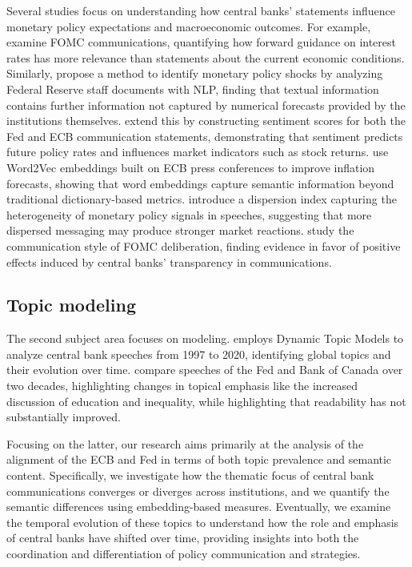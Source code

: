 Several studies focus on understanding how central banks' statements influence monetary policy expectations and macroeconomic outcomes. For example, \cite{hansen_shocking_2016} examine FOMC communications, quantifying how forward guidance on interest rates has more relevance than statements about the current economic conditions. Similarly,  \cite{aruoba_identifying_2024} propose a method to identify monetary policy shocks by analyzing Federal Reserve staff documents with NLP, finding that textual information contains further information not captured by numerical forecasts provided by the institutions themselves. \cite{hilscher_information_2024} extend this by constructing sentiment scores for both the Fed and ECB communication statements, demonstrating that sentiment predicts future policy rates and influences market indicators such as stock returns. \cite{ecb_word2prices_2025} use Word2Vec embeddings built on ECB press conferences to improve inflation forecasts, showing that word embeddings capture semantic information beyond traditional dictionary-based metrics. \cite{ahrens_extracting_2021} introduce a dispersion index capturing the heterogeneity of monetary policy signals in speeches, suggesting that more dispersed messaging may produce stronger market reactions. \cite{hansen_transparency_2018} study the communication style of FOMC deliberation, finding evidence in favor of positive effects induced by central banks' transparency in communications. 

\subsection{Topic modeling}

The second subject area focuses on modeling.  \cite{hansson_evolution_2021} employs Dynamic Topic Models to analyze central bank speeches from 1997 to 2020, identifying global topics and their evolution over time. \cite{ahrens_extracting_2021} compare speeches of the Fed and Bank of Canada over two decades, highlighting changes in topical emphasis like the increased discussion of education and inequality, while highlighting that readability has not substantially improved.

Focusing on the latter, our research aims primarily at the analysis of the alignment of the ECB and Fed in terms of both topic prevalence and semantic content. Specifically, we investigate how the thematic focus of central bank communications converges or diverges across institutions, and we quantify the semantic differences using embedding-based measures. Eventually, we examine the temporal evolution of these topics to understand how the role and emphasis of central banks have shifted over time, providing insights into both the coordination and differentiation of policy communication and strategies.

